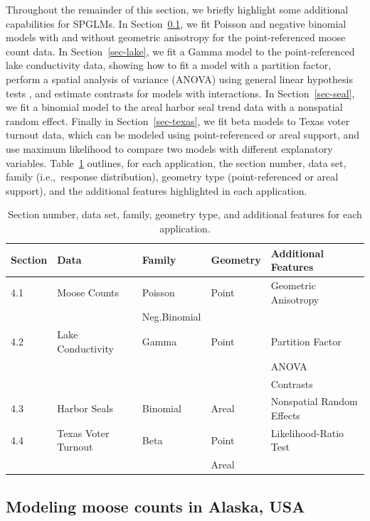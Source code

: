 \documentclass[
]{jss}
\begin{document}
Throughout the remainder of this section, we briefly highlight some
additional  capabilities for SPGLMs. In
Section~\ref{sec-moose-count}, we fit Poisson and negative binomial
models with and without geometric anisotropy for the point-referenced
moose count data. In Section~\ref{sec-lake}, we fit a Gamma model to the
point-referenced lake conductivity data, showing how to fit a model with
a partition factor, perform a spatial analysis of variance (ANOVA) using
general linear hypothesis tests \citep{schabenberger2017statistical},
and estimate contrasts for models with interactions. In
Section~\ref{sec-seal}, we fit a binomial model to the areal harbor seal
trend data with a nonspatial random effect. Finally in
Section~\ref{sec-texas}, we fit beta models to Texas voter turnout data,
which can be modeled using point-referenced or areal support, and use
maximum likelihood to compare two models with different explanatory
variables. Table~\ref{tab:additional} outlines, for each application,
the section number, data set, family (i.e.,~response distribution),
geometry type (point-referenced or areal support), and the additional
 features highlighted in each application.

\begin{table}
    \centering
    \begin{tabular}{|l|llll|}
    \hline
    Section & Data & Family & Geometry & Additional Features \\
    \hline
    \hline
    4.1 & Moose Counts & Poisson & Point & Geometric Anisotropy  \\
    &  & Neg.Binomial &  &  \\
    \hline
    4.2 & Lake Conductivity & Gamma & Point & Partition Factor  \\
    & & & & ANOVA \\
    & & & & Contrasts \\
    \hline
    4.3 & Harbor Seals & Binomial & Areal & Nonspatial Random Effects  \\
    \hline
    4.4 & Texas Voter Turnout & Beta & Point & Likelihood-Ratio Test  \\
    & & & Areal & \\
    \hline 
    \end{tabular}
\caption{Section number, data set, family, geometry type, and additional features for each application.}
\label{tab:additional}
\end{table}

\subsection{Modeling moose counts in Alaska, USA}\label{sec-moose-count}
\end{document}
